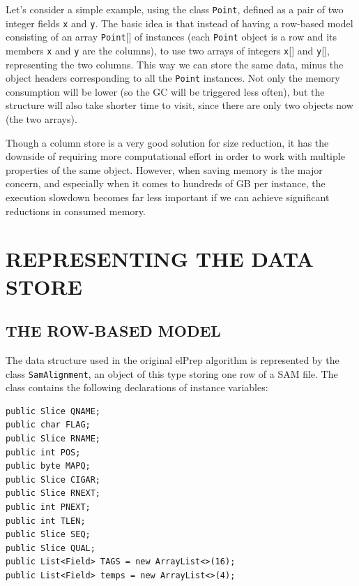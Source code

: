 \documentclass[a4paper,twoside]{article}
\begin{document}
Let's consider a simple example, using the class \texttt{Point}, defined as a pair of two integer fields \texttt{x} and \texttt{y}.
The basic idea is that instead of having a row-based model consisting of an array {\texttt{Point}[]} of instances (each {\texttt{Point}} object is a row and its members \texttt{x} and \texttt{y} are the columns), to use two arrays of integers {\texttt{x}[]} and {\texttt{y}[]}, representing the two columns.
This way we can store the same data, minus the object headers corresponding to all the {\texttt{Point}} instances.
Not only the memory consumption will be lower (so the GC will be triggered less often), but the structure will also take shorter time to visit, since there are only two objects now (the two arrays).

Though a column store is a very good solution for size reduction, it has the downside of requiring more computational effort in order to work with multiple properties of the same object.
However, when saving memory is the major concern, and especially when it comes to hundreds of GB per instance, the execution slowdown becomes far less important if we can achieve significant reductions in consumed memory.





\section{\uppercase{Representing the Data Store}}
\label{model}

\subsection{\uppercase{The Row-Based Model}}
\label{model:row}

The data structure used in the original elPrep algorithm is represented by the class \texttt{SamAlignment}, an object of this type storing one row of a SAM file.
The class contains the following declarations of instance variables:

\begin{small}
\begin{verbatim}
public Slice QNAME;
public char FLAG;
public Slice RNAME;
public int POS;
public byte MAPQ;
public Slice CIGAR;
public Slice RNEXT;
public int PNEXT;
public int TLEN;
public Slice SEQ;
public Slice QUAL;
public List<Field> TAGS = new ArrayList<>(16);
public List<Field> temps = new ArrayList<>(4);
\end{verbatim}
\end{small}
\end{document}
